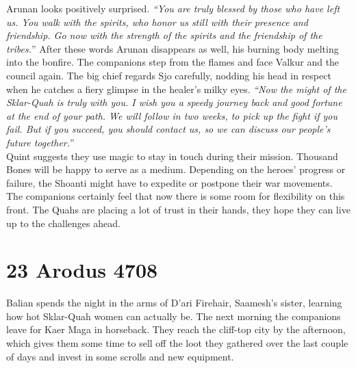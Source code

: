 Arunan looks positively surprised. {\itshape``You are truly blessed by those who have left us. You walk with the spirits, who honor us still with their presence and friendship. Go now with the strength of the spirits and the friendship of the tribes.}'' After these words Arunan disappears as well, his burning body melting into the bonfire. The companions step from the flames and face Valkur and the council again. The big chief regards Sjo carefully, nodding his head in respect when he catches a fiery glimpse in the healer's milky eyes. {\itshape``Now the might of the Sklar-Quah is truly with you. I wish you a speedy journey back and good fortune at the end of your path. We will follow in two weeks, to pick up the fight if you fail. But if you succeed, you should contact us, so we can discuss our people's future together.}''\\

Quint suggests they use magic to stay in touch during their mission. Thousand Bones will be happy to serve as a medium. Depending on the heroes' progress or failure, the Shoanti might have to expedite or postpone their war movements. The companions certainly feel that now there is some room for flexibility on this front. The Quahs are placing a lot of trust in their hands, they hope they can live up to the challenges ahead.\\

\section{23 Arodus 4708}

Balian spends the night in the arms of D'ari Firehair, Saamesh's sister, learning how hot Sklar-Quah women can actually be. The next morning the companions leave for Kaer Maga in horseback. They reach the cliff-top city by the afternoon, which gives them some time to sell off the loot they gathered over the last couple of days and invest in some scrolls and new equipment.\\

